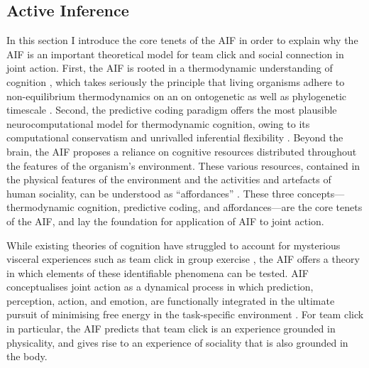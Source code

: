\begin{CJK}{UTF8}{gbsn}
\section{Active Inference \label{sect:activeIn}}
In this section I introduce the core tenets of the AIF in order to explain why the AIF is an important theoretical model for team click and social connection in joint action.  First, the AIF is rooted in a thermodynamic understanding of cognition \citep{Yufik2017}, which takes seriously the principle that living organisms adhere to non-equilibrium thermodynamics on an on ontogenetic as well as phylogenetic timescale \citep{Friston2010,Yufik2002,Sengupta2016,Linson2018}.  Second, the predictive coding paradigm \citep[see][]{Rao1999,Clark2013} offers the most plausible neurocomputational model for thermodynamic cognition, owing to its computational conservatism and unrivalled inferential flexibility \citep{Friston2006}.  Beyond the brain, the AIF proposes a reliance on cognitive resources distributed throughout the features of the organism’s environment.  These various resources, contained in the physical features of the environment and the activities and artefacts of human sociality, can be understood as ``affordances'' \citep{Gibson1979,Ramstead2016,Bruineberg2014}. These three concepts---thermodynamic cognition, predictive coding, and affordances---are the core tenets of the AIF, and lay the foundation for application of AIF to joint action.


While existing theories of cognition have struggled to account for mysterious visceral experiences such as team click in group exercise \citep{Dietrich2004,Slingerland2014}, the AIF offers a theory in which elements of these identifiable phenomena can be tested.  AIF conceptualises joint action as a dynamical process in which prediction, perception, action, and emotion, are functionally integrated in the ultimate pursuit of minimising free energy in the task-specific environment \citep{Clark2015}.  For team click in particular, the AIF predicts that team click is an experience grounded in physicality, and gives rise to an experience of sociality that is also grounded in the body.



\end{CJK}
